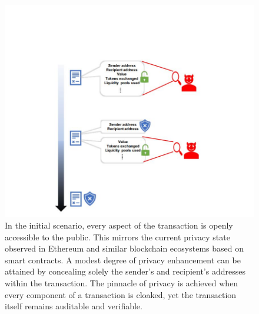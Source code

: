 \documentclass{report}
\begin{document}
\begin{center}
	\begin{figure}
		\centering
		\includegraphics[width=0.8\linewidth]{Fig/F4}
		\caption{In the initial scenario, every aspect of the transaction is openly accessible to the public. This mirrors the current privacy state observed in Ethereum and similar blockchain ecosystems based on smart contracts. A modest degree of privacy enhancement can be attained by concealing solely the sender's and recipient's addresses within the transaction. The pinnacle of privacy is achieved when every component of a transaction is cloaked, yet the transaction itself remains auditable and verifiable.
		}
		\label{fig:f4}
	\end{figure}
\end{center}
\end{document}
